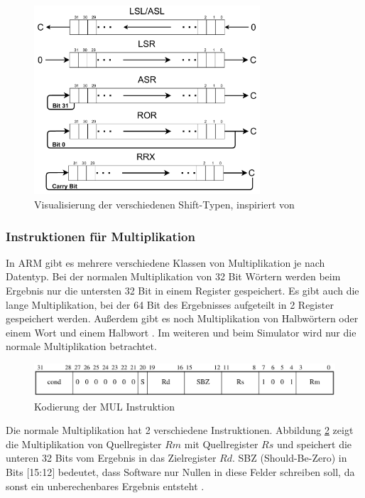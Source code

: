 \documentclass[a4paper, 11pt, onecolumn]{article}
\begin{document}
\begin{figure}[!htb]
\centering
\includegraphics[width=0.75\textwidth]{data/shift}
\caption{Visualisierung der verschiedenen Shift-Typen, inspiriert von \cite{assembly}}
\label{fig:shift}
\end{figure}

\subsubsection{Instruktionen für Multiplikation}

In ARM gibt es mehrere verschiedene Klassen von Multiplikation je nach Datentyp. Bei der normalen Multiplikation von 32 Bit Wörtern werden beim Ergebnis nur die untersten 32 Bit in einem Register gespeichert. Es gibt auch die lange Multiplikation, bei der 64 Bit des Ergebnisses aufgeteilt in 2 Register gespeichert werden. Außerdem gibt es noch Multiplikation von Halbwörtern oder einem Wort und einem Halbwort \cite{arm:2005}. Im weiteren und beim Simulator wird nur die normale Multiplikation betrachtet.

\begin{figure}[!htb]
\centering
\includegraphics[width=1\textwidth]{data/mul}
\caption{Kodierung der MUL Instruktion \cite{arm:2005}}
\label{fig:mul}
\end{figure}

Die normale Multiplikation hat 2 verschiedene Instruktionen. Abbildung \ref{fig:mul} zeigt die Multiplikation von Quellregister $Rm$ mit Quellregister $Rs$ und speichert die unteren 32 Bits vom Ergebnis in das Zielregister $Rd$. SBZ (Should-Be-Zero) in Bits $[$15:12$]$ bedeutet, dass Software nur Nullen in diese Felder schreiben soll, da sonst ein unberechenbares Ergebnis entsteht \cite{arm:2005}.
\end{document}
